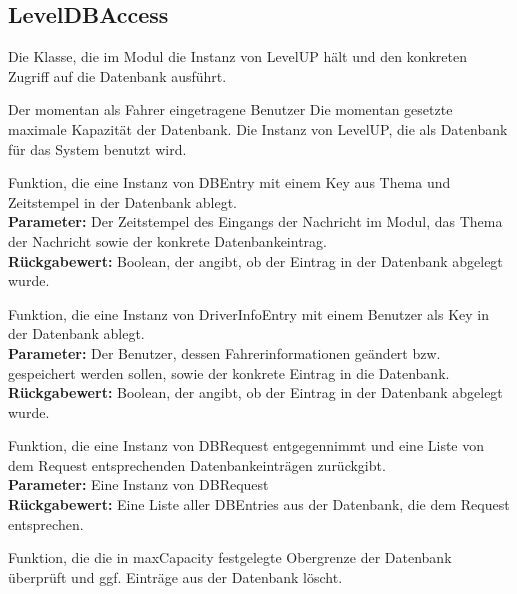 \documentclass[entwurf.tex]{subfiles}
\begin{document}
	\subsection{LevelDBAccess}
	\label{Class:LevelDBAccess}
	Die Klasse, die im Modul die Instanz von LevelUP hält und den konkreten Zugriff auf die Datenbank ausführt. \\
	\begin{description}
	 Der momentan als Fahrer eingetragene Benutzer 
	 Die momentan gesetzte maximale Kapazität der Datenbank. 
	 Die Instanz von LevelUP, die als Datenbank für das System benutzt wird. 
	
	Funktion, die eine Instanz von DBEntry mit einem Key aus  Thema und Zeitstempel in der Datenbank ablegt. \\
	\textbf{Parameter:} Der Zeitstempel des Eingangs der Nachricht im Modul, das Thema der Nachricht sowie der konkrete Datenbankeintrag. \\
	\textbf{Rückgabewert:} Boolean, der angibt, ob der Eintrag in der Datenbank abgelegt wurde. 
	
	Funktion, die eine Instanz von DriverInfoEntry mit einem Benutzer als Key in der Datenbank ablegt. \\
	\textbf{Parameter:} Der Benutzer, dessen Fahrerinformationen geändert bzw. gespeichert werden sollen, sowie der konkrete Eintrag in die Datenbank. \\
	\textbf{Rückgabewert:} Boolean, der angibt, ob der Eintrag in der Datenbank abgelegt wurde. 
	
	Funktion, die eine Instanz von DBRequest entgegennimmt und eine Liste von dem Request entsprechenden Datenbankeinträgen zurückgibt. \\
	\textbf{Parameter:} Eine Instanz von DBRequest \\
	\textbf{Rückgabewert:} Eine Liste aller DBEntries aus der Datenbank, die dem Request entsprechen. 
	
	Funktion, die die in maxCapacity festgelegte Obergrenze der Datenbank überprüft und ggf. Einträge aus der Datenbank löscht. \\
	\end{description}
	
\end{document}
